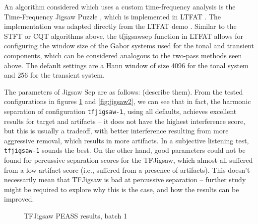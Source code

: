 \documentclass[letter,12pt]{article}
\begin{document}
An algorithm considered which uses a custom time-frequency analysis is the Time-Frequency Jigsaw Puzzle \cite{tfjigsaw}, which is implemented in LTFAT \cite{tfjigsaw2}. The implementation was adapted directly from the LTFAT demo \cite{tfjigsaw3}. Similar to the STFT or CQT algorithms above, the tfjigsawsep function in LTFAT allows for configuring the window size of the Gabor systems used for the tonal and transient components, which can be considered analogous to the two-pass methods seen above. The default settings are a Hann window of size 4096 for the tonal system and 256 for the transient system.

The parameters of Jigsaw Sep are as follows: (describe them). From the tested configurations in figures \ref{fig:jigsaw1} and \ref{fig:jigsaw2}, we can see that in fact, the harmonic separation of configuration \Verb#tfjigsaw-1#, using all defaults, achieves excellent results for target and artifacts -- it does not have the highest interference score, but this is usually a tradeoff, with better interference resulting from more aggressive removal, which results in more artifacts. In a subjective listening test, \Verb#tfjigsaw-1# sounds the best. On the other hand, good parameters could not be found for percussive separation scores for the TFJigsaw, which almost all suffered from a low artifact score (i.e., suffered from a presence of artifacts). This doesn't necessarily mean that TFJigsaw  is bad at percussive separation -- further study might be required to explore why this is the case, and how the results can be improved.

\begin{figure}[ht]
	\centering
	\vspace{-1.25em}
	\caption{TFJigsaw PEASS results, batch 1}
	\label{fig:jigsaw1}
\end{figure}
\end{document}
